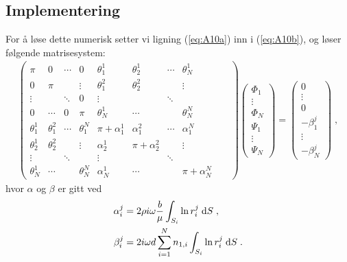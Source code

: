 \documentclass[a4paper,norsk]{article}
\begin{document}
\subsection*{Implementering}
For å løse dette numerisk setter vi ligning (\ref{eq:A10a}) inn i (\ref{eq:A10b}),
og løser følgende matrisesystem:
\begin{align*}
  \begin{pmatrix}
    \pi & 0 & \cdots & 0 & \theta^1_1 & \theta^1_2 & \cdots & \theta^1_N \\
    0 & \pi &  & \vdots & \theta^2_1 & \theta^2_2 &  & \vdots \\
    \vdots & & \ddots & 0 & \vdots & & \ddots & & & \\
    0 & \cdots & 0 & \pi & \theta^1_N & \cdots & & \theta^N_N \\
    \theta^1_1 & \theta^2_1 & \cdots & \theta^N_1 & \pi+\alpha_1^1 & \alpha_1^2 & \cdots & \alpha^N_1 \\
    \theta^1_2 & \theta^2_2 &  & \vdots & \alpha^1_2 & \pi+\alpha^2_2 &  & \vdots \\
    \vdots & & \ddots & & \vdots & & \ddots &  \\
    \theta^1_N & \cdots & & \theta^N_N & \alpha_N^1 & \cdots &  & \pi+\alpha^N_N
  \end{pmatrix}
  \begin{pmatrix}
    \Phi_1 \\ \vdots \\ \Phi_N \\ \Psi_1 \\ \vdots \\ \Psi_N
  \end{pmatrix} = 
  \begin{pmatrix}
    0 \\ \vdots \\ 0 \\  -\beta^j_1 \\ \vdots \\ -\beta^j_N
  \end{pmatrix} \;,
\end{align*}
hvor $\alpha$ og $\beta$ er gitt ved
\begin{align*}
  \alpha^j_i &= 2\rho i\omega \frac{b}{\mu}\int_{S_i}\ln r^j_i \;\mathrm{d} S\;,\\
  \beta^j_i &= 2i\omega d\sum_{i=1}^Nn_{1,i}\int_{S_i}\ln r_i^j \;\mathrm{d} S\;.
\end{align*}

\end{document}
